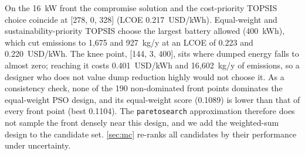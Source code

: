 \documentclass[final,3p,times]{elsarticle}
\begin{document}
On the 16~kW front the compromise solution and the cost-priority TOPSIS choice coincide at [278, 0, 328] (LCOE 0.217~USD/kWh). Equal-weight and sustainability-priority TOPSIS choose the largest battery allowed (400~kWh), which cut emissions to 1,675 and 927~kg/y at an LCOE of 0.223 and 0.220~USD/kWh. The knee point, [144, 3, 400], sits where dumped energy falls to almost zero; reaching it costs 0.401~USD/kWh and 16,602~kg/y of emissions, so a designer who does not value dump reduction highly would not choose it. As a consistency check, none of the 190 non-dominated front points dominates the equal-weight PSO design, and its equal-weight score (0.1089) is lower than that of every front point (best 0.1104). The \texttt{paretosearch} approximation therefore does not sample the front densely near this design, and we add the weighted-sum design to the candidate set. \cref{sec:mc} re-ranks all candidates by their performance under uncertainty.
\end{document}
